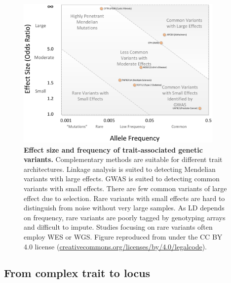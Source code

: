 \begin{outline}
\begin{figure}
    \centering
    \includegraphics[width=0.9\textwidth,page=1]{mainmatter/figures/chapter_01/bush2012Chapter11GenomeWide/journal.pcbi.1002822.g001.png}
    \caption{
        \textbf{Effect size and frequency of trait-associated genetic variants.}
        Complementary methods are suitable for different trait architectures.
        Linkage analysis is suited to detecting Mendelian variants with large effects.
        \gls{GWAS} is suited to detecting common variants with small effects.
        There are few common variants of large effect  due to selection.
        Rare variants with small effects are hard to distinguish from noise without very large samples.
        As \gls{LD} depends on frequency, rare variants are poorly tagged by genotyping arrays and difficult to impute.
        Studies focusing on rare variants often employ \gls{WES} or \gls{WGS}.
        Figure reproduced from \textcite{bush2012Chapter11GenomeWide} under the CC BY 4.0 license (\url{creativecommons.org/licenses/by/4.0/legalcode}).
    }
    \label{fig:intro_effectSizeVsFrequency}
\end{figure}

\subsection{From complex trait to locus}


\end{outline}
